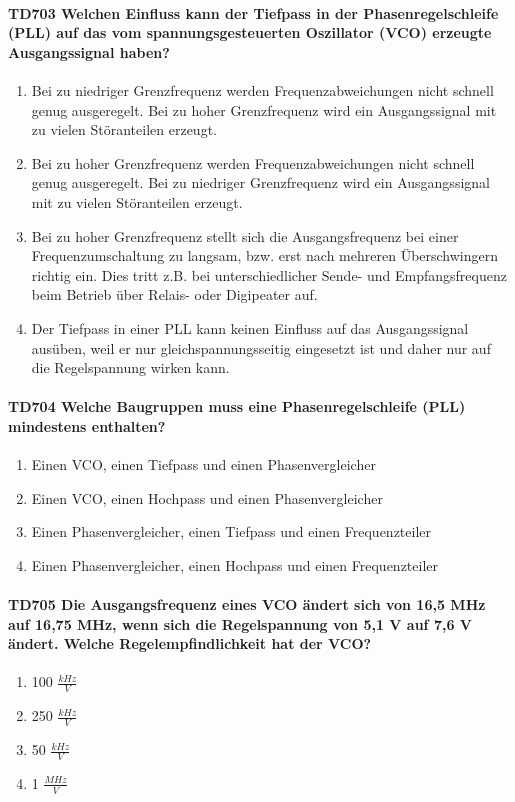 \documentclass[8pt]{article}
\begin{document}
\begin{enumerate}
\begin{enumerate}[nolistsep,label=\Alph*]
\paragraph*{TD703 Welchen Einfluss kann der Tiefpass in der Phasenregelschleife (PLL) auf das vom spannungsgesteuerten Oszillator (VCO) erzeugte Ausgangssignal haben?}
\begin{enumerate}[nolistsep,label=\Alph*]
\item Bei zu niedriger Grenzfrequenz werden Frequenzabweichungen nicht schnell genug ausgeregelt. Bei zu hoher Grenzfrequenz wird ein Ausgangssignal mit zu vielen Störanteilen erzeugt. 
\item Bei zu hoher Grenzfrequenz werden Frequenzabweichungen nicht schnell genug ausgeregelt.
Bei zu niedriger Grenzfrequenz wird ein Ausgangssignal mit zu vielen Störanteilen erzeugt. 
\item Bei zu hoher Grenzfrequenz stellt sich die Ausgangsfrequenz bei einer Frequenzumschaltung zu langsam, bzw. erst nach mehreren Überschwingern richtig ein. Dies tritt z.B. bei unterschiedlicher Sende- und Empfangsfrequenz beim Betrieb über Relais- oder Digipeater auf. 
\item Der Tiefpass in einer PLL kann keinen Einfluss auf das Ausgangssignal ausüben, weil er nur gleichspannungsseitig eingesetzt ist und daher nur auf die Regelspannung wirken kann.
\end{enumerate}

\paragraph*{TD704 Welche Baugruppen muss eine Phasenregelschleife (PLL) mindestens enthalten?}
\begin{enumerate}[nolistsep,label=\Alph*]
\item Einen VCO, einen Tiefpass und einen Phasenvergleicher
\item Einen VCO, einen Hochpass und einen Phasenvergleicher
\item Einen Phasenvergleicher, einen Tiefpass und einen Frequenzteiler
\item Einen Phasenvergleicher, einen Hochpass und einen Frequenzteiler 
\end{enumerate}

\paragraph*{TD705 Die Ausgangsfrequenz eines VCO ändert sich von 16,5 MHz auf 16,75 MHz, wenn sich die Regelspannung von 5,1 V auf 7,6 V ändert. Welche Regelempfindlichkeit hat der VCO?}
\begin{enumerate}[nolistsep,label=\Alph*]
\item 100 $\frac{kHz}{V}$
\item 250 $\frac{kHz}{V}$
\item 50 $\frac{kHz}{V}$
\item 1 $\frac{MHz}{V}$
\end{enumerate}


\end{enumerate}
\end{enumerate}
\end{document}
